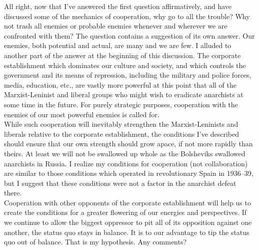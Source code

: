 All right, now that I've answered the first question affirmatively, and have discussed some of the mechanics of cooperation, why go to all the trouble? Why not trash all enemies or probable enemies whenever and wherever we are confronted with them? The question contains a suggestion of its own answer. Our enemies, both potential and actual, are many and we are few. I alluded to another part of the answer at the beginning of this discussion. The corporate establishment which dominates our culture and society, and which controls the government and its means of repression, including the military and police forces, media, education, etc., are vastly more powerful at this point that all of the Marxist-Leninist and liberal groups who might wish to eradicate anarchists at some time in the future. For purely strategic purposes, cooperation with the enemies of our most powerful enemies is called for.\\
While such cooperation will inevitably strengthen the Marxist-Leninists and liberals relative to the corporate establishment, the conditions I've described should ensure that our own strength should grow apace, if not more rapidly than theirs. At least we will not be swallowed up whole as the Bolsheviks swallowed anarchists in Russia. I realize my conditions for cooperation (not collaboration) are similar to those conditions which operated in revolutionary Spain in 1936--39, but I suggest that these conditions were not a factor in the anarchist defeat there.\\
Cooperation with other opponents of the corporate establishment will help us to create the conditions for a greater flowering of our energies and perspectives. If we continue to allow the biggest oppressor to pit all of its opposition against one another, the status quo stays in balance. It is to our advantage to tip the status quo out of balance. That is my hypothesis. Any comments?